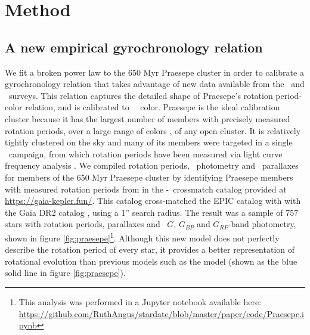 \section{Method}
\label{section:method}
\subsection{A new empirical gyrochronology relation}

We fit a broken power law to the 650 Myr Praesepe cluster in order to
calibrate a gyrochronology relation that takes advantage of new data available
from the \ktwo\ and \gaia\ surveys.
This relation captures the detailed shape of Praesepe's rotation period-color
relation, and is calibrated to \gaia\ \gcolor\ color.
Praesepe is the ideal calibration cluster because it has the largest number of
members with precisely measured rotation periods, over a large range of colors
\citep[spanning spectral types A0 through M6,][]{rebull2017}, of any open
cluster.
It is relatively tightly clustered on the sky and many of its members were
targeted in a single \ktwo\ campaign, from which rotation periods have been
measured via light curve frequency analysis \citep{douglas2017, rebull2017}.
We compiled rotation periods, \Gaia\ photometry and \gaia\ parallaxes for
members of the 650 Myr Praesepe cluster \citep{fossati2008} by identifying
Praesepe members with measured rotation periods from \citet{douglas2017} in
the \ktwo-\gaia\ crossmatch catalog provided at
\url{https://gaia-kepler.fun/}.
This catalog cross-matched the EPIC catalog \citep{huber2016} with with the
Gaia DR2 catalog \citep{brown2018}, using a 1'' search radius.
The result was a sample of 757 stars with rotation periods, parallaxes and
\gaia\ $G$, $G_{BP}$ and $G_{RP}$-band photometry, shown in figure
\ref{fig:praesepe}\footnote{This analysis was performed in a Jupyter notebook
available here: \url{
    https://github.com/RuthAngus/stardate/blob/master/paper/code/Praesepe.ipynb}}.
Although this new model does not perfectly describe the rotation period of
every star, it provides a better representation of rotational evolution than
previous models such as the \citet{angus2015} model (shown as the blue solid
line in figure \ref{fig:praesepe}).
